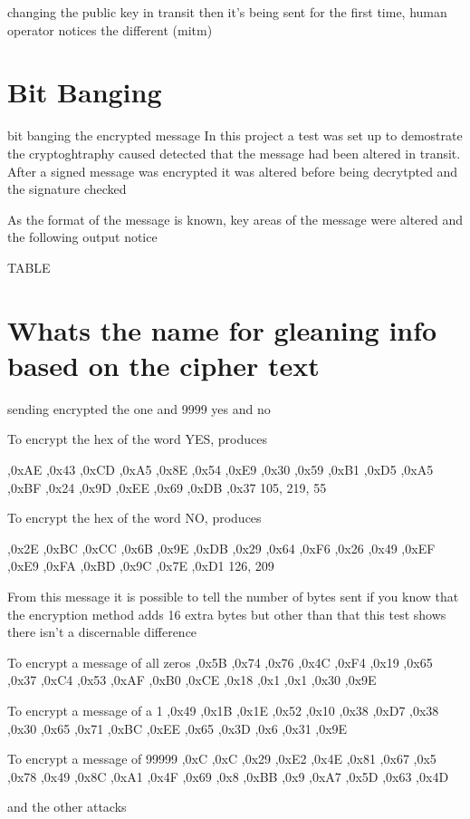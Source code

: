 changing the public key in transit then it's being sent for the first time, human operator notices the different (mitm)

\section{Bit Banging}

bit banging the encrypted message
In this project a test was set up to demostrate the cryptoghtraphy caused detected that the message had been altered in transit.
After a signed message was encrypted it was altered before being decrytpted and the signature checked

As the format of the message is known, key areas of the message were altered and the following output notice

TABLE


\section{Whats the name for gleaning info based on the cipher text}

sending encrypted the one and 9999
yes and no

To encrypt the hex of the word YES, produces 

,0xAE ,0x43 ,0xCD ,0xA5 ,0x8E ,0x54 ,0xE9 ,0x30
 ,0x59 ,0xB1 ,0xD5 ,0xA5 ,0xBF ,0x24 ,0x9D ,0xEE
 ,0x69 ,0xDB ,0x37
 105, 219, 55

To encrypt the hex of the word NO, produces 

 ,0x2E ,0xBC ,0xCC ,0x6B ,0x9E ,0xDB ,0x29 ,0x64
 ,0xF6 ,0x26 ,0x49 ,0xEF ,0xE9 ,0xFA ,0xBD ,0x9C
 ,0x7E ,0xD1
126, 209

From this message it is possible to tell the number of bytes sent if you know that the encryption method adds 16 extra bytes but other than that this test shows there isn't a discernable difference


To encrypt a message of all zeros
,0x5B ,0x74 ,0x76 ,0x4C ,0xF4 ,0x19 ,0x65 ,0x37
 ,0xC4 ,0x53 ,0xAF ,0xB0 ,0xCE ,0x18 ,0x1 ,0x1
 ,0x30 ,0x9E

To encrypt a message of a 1
,0x49 ,0x1B ,0x1E ,0x52 ,0x10 ,0x38 ,0xD7 ,0x38
 ,0x30 ,0x65 ,0x71 ,0xBC ,0xEE ,0x65 ,0x3D ,0x6
 ,0x31 ,0x9E

To encrypt a message of 99999
,0xC ,0xC ,0x29 ,0xE2 ,0x4E ,0x81 ,0x67 ,0x5
 ,0x78 ,0x49 ,0x8C ,0xA1 ,0x4F ,0x69 ,0x8 ,0xBB
 ,0x9 ,0xA7 ,0x5D ,0x63 ,0x4D

and the other attacks